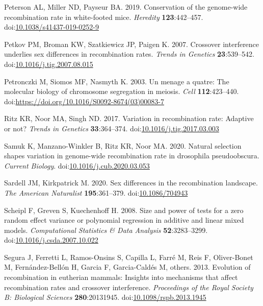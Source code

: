 \documentclass[
]{article}
\begin{document}
\leavevmode\hypertarget{ref-peterson2019}{}%
Peterson AL, Miller ND, Payseur BA. 2019. Conservation of the
genome-wide recombination rate in white-footed mice. \emph{Heredity}
\textbf{123}:442--457.
doi:\href{https://doi.org/10.1038/s41437-019-0252-9}{10.1038/s41437-019-0252-9}

\leavevmode\hypertarget{ref-petkov2007}{}%
Petkov PM, Broman KW, Szatkiewicz JP, Paigen K. 2007. Crossover
interference underlies sex differences in recombination rates.
\emph{Trends in Genetics} \textbf{23}:539--542.
doi:\href{https://doi.org/10.1016/j.tig.2007.08.015}{10.1016/j.tig.2007.08.015}

\leavevmode\hypertarget{ref-petronczki2003}{}%
Petronczki M, Siomos MF, Nasmyth K. 2003. Un menage a quatre: The
molecular biology of chromosome segregation in meiosis. \emph{Cell}
\textbf{112}:423--440.
doi:\href{https://doi.org/https://doi.org/10.1016/S0092-8674(03)00083-7}{https://doi.org/10.1016/S0092-8674(03)00083-7}

\leavevmode\hypertarget{ref-Ritz2017}{}%
Ritz KR, Noor MA, Singh ND. 2017. Variation in recombination rate:
Adaptive or not? \emph{Trends in Genetics} \textbf{33}:364--374.
doi:\href{https://doi.org/10.1016/j.tig.2017.03.003}{10.1016/j.tig.2017.03.003}

\leavevmode\hypertarget{ref-samuk2020}{}%
Samuk K, Manzano-Winkler B, Ritz KR, Noor MA. 2020. Natural selection
shapes variation in genome-wide recombination rate in drosophila
pseudoobscura. \emph{Current Biology}.
doi:\href{https://doi.org/10.1016/j.cub.2020.03.053}{10.1016/j.cub.2020.03.053}

\leavevmode\hypertarget{ref-sardell_sex_2020}{}%
Sardell JM, Kirkpatrick M. 2020. Sex differences in the recombination
landscape. \emph{The American Naturalist} \textbf{195}:361--379.
doi:\href{https://doi.org/10.1086/704943}{10.1086/704943}

\leavevmode\hypertarget{ref-RLRsim}{}%
Scheipl F, Greven S, Kuechenhoff H. 2008. Size and power of tests for a
zero random effect variance or polynomial regression in additive and
linear mixed models. \emph{Computational Statistics \& Data Analysis}
\textbf{52}:3283--3299.
doi:\href{https://doi.org/10.1016/j.csda.2007.10.022}{10.1016/j.csda.2007.10.022}

\leavevmode\hypertarget{ref-segura2013}{}%
Segura J, Ferretti L, Ramos-Onsins S, Capilla L, Farré M, Reis F,
Oliver-Bonet M, Fernández-Bellón H, Garcia F, Garcia-Caldés M, others.
2013. Evolution of recombination in eutherian mammals: Insights into
mechanisms that affect recombination rates and crossover interference.
\emph{Proceedings of the Royal Society B: Biological Sciences}
\textbf{280}:20131945.
doi:\href{https://doi.org/10.1098/rspb.2013.1945}{10.1098/rspb.2013.1945}
\end{document}
